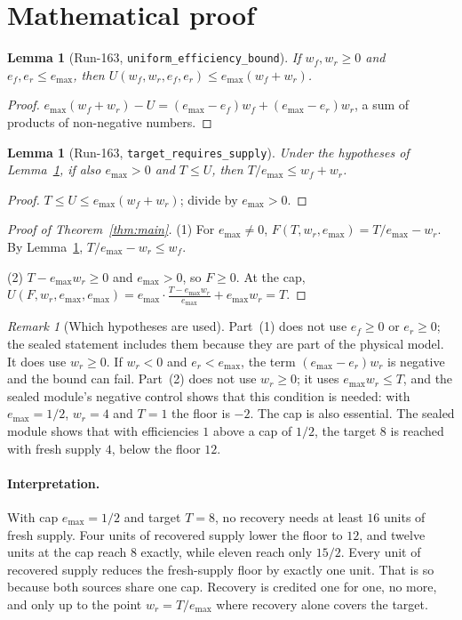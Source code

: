 \documentclass[11pt]{article}
\newtheorem{lemma}[theorem]{Lemma}
\theoremstyle{definition}
\theoremstyle{remark}
\newtheorem*{remark}{Remark}
\begin{document}
\section{Mathematical proof}
\label{sec:math}
\begin{lemma}[Run-163, \texttt{uniform\_efficiency\_bound}]\label{lem:ueb}
If $w_f,w_r\ge0$ and $e_f,e_r\le e_{\max}$, then $U(w_f,w_r,e_f,e_r)\le e_{\max}(w_f+w_r)$.
\end{lemma}
\begin{proof}
$e_{\max}(w_f+w_r)-U=(e_{\max}-e_f)w_f+(e_{\max}-e_r)w_r$, a sum of products of non-negative
numbers.
\end{proof}

\begin{lemma}[Run-163, \texttt{target\_requires\_supply}]\label{lem:trs}
Under the hypotheses of Lemma~\ref{lem:ueb}, if also $e_{\max}>0$ and $T\le U$, then
$T/e_{\max}\le w_f+w_r$.
\end{lemma}
\begin{proof}
$T\le U\le e_{\max}(w_f+w_r)$; divide by $e_{\max}>0$.
\end{proof}

\begin{proof}[Proof of Theorem~\ref{thm:main}]
(1) For $e_{\max}\ne0$, $F(T,w_r,e_{\max})=T/e_{\max}-w_r$. By Lemma~\ref{lem:trs},
$T/e_{\max}-w_r\le w_f$.

(2) $T-e_{\max}w_r\ge0$ and $e_{\max}>0$, so $F\ge0$. At the cap,
$U(F,w_r,e_{\max},e_{\max})=e_{\max}\cdot\frac{T-e_{\max}w_r}{e_{\max}}+e_{\max}w_r=T$.
\end{proof}

\begin{remark}[Which hypotheses are used]
Part~(1) does not use $e_f\ge0$ or $e_r\ge0$; the sealed statement includes them because they are
part of the physical model. It does use $w_r\ge0$. If $w_r<0$ and $e_r<e_{\max}$, the term
$(e_{\max}-e_r)w_r$ is negative and the bound can fail. Part~(2) does not use $w_r\ge0$; it uses
$e_{\max}w_r\le T$, and the sealed module's negative control shows that this condition is needed:
with $e_{\max}=1/2$, $w_r=4$ and $T=1$ the floor is $-2$. The cap is also essential. The sealed
module shows that with efficiencies $1$ above a cap of $1/2$, the target $8$ is reached with fresh
supply $4$, below the floor $12$.
\end{remark}

\paragraph{Interpretation.} With cap $e_{\max}=1/2$ and target $T=8$, no recovery needs at least
$16$ units of fresh supply. Four units of recovered supply lower the floor to $12$, and twelve
units at the cap reach $8$ exactly, while eleven reach only $15/2$. Every unit of recovered supply
reduces the fresh-supply floor by exactly one unit. That is so because both sources share one cap.
Recovery is credited one for one, no more, and only up to the point $w_r=T/e_{\max}$ where recovery
alone covers the target.
\end{document}
